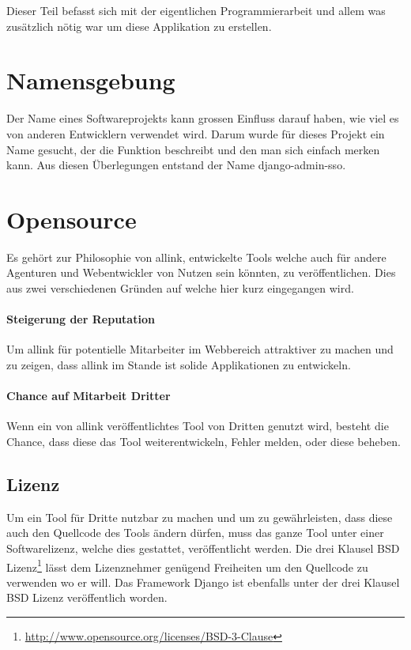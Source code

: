 Dieser Teil befasst sich mit der eigentlichen Programmierarbeit und allem was zusätzlich nötig war um diese Applikation zu erstellen.

\section{Namensgebung}
\label{sec:namensgebung}
Der Name eines Softwareprojekts kann grossen Einfluss darauf haben, wie viel es von anderen Entwicklern verwendet wird. Darum wurde für dieses Projekt ein Name gesucht, der die Funktion beschreibt und den man sich einfach merken kann. Aus diesen Überlegungen entstand der Name django-admin-sso.

\section{Opensource}
\label{sec:opensource}
Es gehört zur Philosophie von allink, entwickelte Tools welche auch für andere Agenturen und Webentwickler von Nutzen sein könnten, zu veröffentlichen. Dies aus zwei verschiedenen Gründen auf welche hier kurz eingegangen wird.

\paragraph{Steigerung der Reputation}
\label{par:steigerung_der_reputation}
Um allink für potentielle Mitarbeiter im Webbereich attraktiver zu machen und zu zeigen, dass allink im Stande ist solide Applikationen zu entwickeln.
\paragraph{Chance auf Mitarbeit Dritter}
\label{par:chance_auf_mitarbeit_dritter}
Wenn ein von allink veröffentlichtes Tool von Dritten genutzt wird, besteht die Chance, dass diese das Tool weiterentwickeln, Fehler melden, oder diese beheben.

\subsection{Lizenz}
\label{sub:lizenz}
Um ein Tool für Dritte nutzbar zu machen und um zu gewährleisten, dass diese auch den Quellcode des Tools ändern dürfen, muss das ganze Tool unter einer Softwarelizenz, welche dies gestattet, veröffentlicht werden. Die drei Klausel BSD Lizenz\footnote{\url{http://www.opensource.org/licenses/BSD-3-Clause}} lässt dem Lizenznehmer genügend Freiheiten um den Quellcode zu verwenden wo er will. Das Framework Django ist ebenfalls unter der drei Klausel BSD Lizenz veröffentlich worden.


